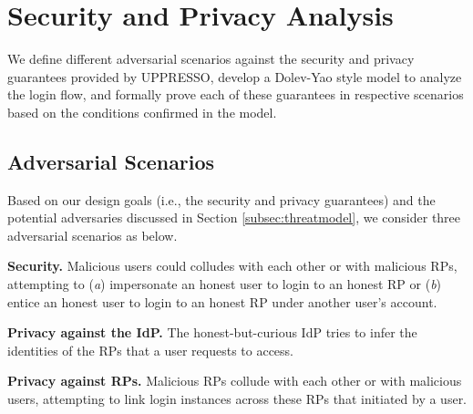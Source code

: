 \section{Security and Privacy Analysis}
\label{sec:analysis}
We define different adversarial scenarios against the security and privacy guarantees provided by UPPRESSO,
    develop a  Dolev-Yao style model to analyze the login flow,
    and formally prove each of these guarantees in respective scenarios based on the conditions confirmed in the model.

\subsection{Adversarial Scenarios}

Based on our design goals (i.e., the security and privacy guarantees) and the potential adversaries discussed in Section \ref{subsec:threatmodel},
we consider three adversarial scenarios as below.

\noindent\textbf{Security.}
Malicious users could colludes with each other or with malicious RPs,
    attempting to (\emph{a}) impersonate an honest user to login to an honest RP or (\emph{b}) entice an honest user to login to an honest RP under another user's account.

\noindent\textbf{Privacy against the IdP.}
The honest-but-curious IdP tries to infer the identities of the RPs that a user requests to access.

\noindent\textbf{Privacy against RPs.}
Malicious RPs collude with each other or with malicious users,
 attempting to link login instances across these RPs that initiated by a user.



